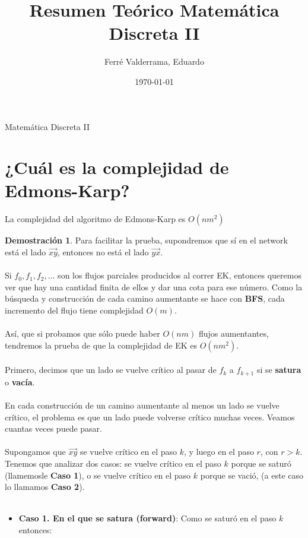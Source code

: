 \documentclass[11pt, a4paper]{article}
\title{Resumen Teórico Matemática Discreta II}
\author{Ferré Valderrama, Eduardo}
\date{\today}
\theoremstyle{definition}
\newtheorem*{demostracion}{Demostración}
\begin{document}
\maketitle
Matemática Discreta II
\tableofcontents

\section{¿Cuál es la complejidad de Edmons-Karp?}

La complejidad del algoritmo de Edmons-Karp es $O(nm^2)$

\begin{demostracion}
    
    Para facilitar la prueba, supondremos que sí en el network está el lado $\overrightarrow{xy}$, 
    entonces no está el lado $\overrightarrow{yx}$.\\ \\
    Si $f_0, f_1, f_2, \ldots$ son los flujos parciales producidos al correr EK, entonces queremos ver que hay una cantidad finita de ellos y dar
    una cota para ese número. Como la búsqueda y construcción de cada camino aumentante se hace con \textbf{BFS}, cada incremento del flujo tiene 
    complejidad $O(m)$. \\ \\
    Así, que si probamos que sólo puede haber $O(nm)$ flujos aumentantes, tendremos la prueba de que la complejidad de EK es $O(nm^2)$.\\ \\
    Primero, decimos que un lado se vuelve crítico al pasar de $f_k$ a $f_{k+1}$ si se \textbf{satura} o \textbf{vacía}.\\ \\
    En cada construcción de un camino aumentante al menos un lado se vuelve crítico, el problema es que un lado puede volverse crítico muchas veces.
    Veamos cuantas veces puede pasar.\\ \\
    Supongamos que $\overrightarrow{xy}$ se vuelve crítico en el paso $k$, y luego en el paso $r$, con $r>k$. Tenemos que analizar dos casos:
    se vuelve crítico en el paso $k$ porque se saturó (llamemosle \textbf{Caso 1}), 
    o se vuelve crítico en el paso $k$ porque se vació, (a este caso lo llamamos \textbf{Caso 2}).\\ \\
    \begin{itemize}
        \item \textbf{Caso 1. En el que se satura (forward)}: Como se saturó en el paso $k$ entonces:

\end{itemize}
\end{demostracion}
\end{document}
